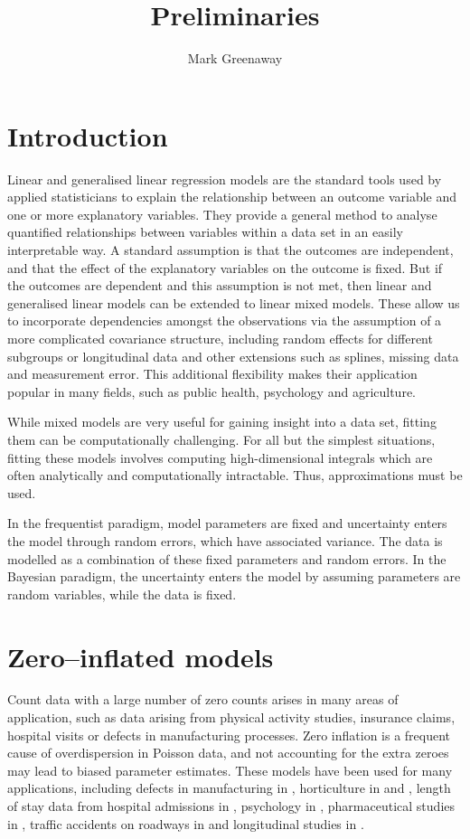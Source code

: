 \documentclass{amsart}[12pt]
\title{Preliminaries}
\author{Mark Greenaway}
\begin{document}
\setlength{\parindent}{0pt}
\maketitle

\section{Introduction}

Linear and generalised linear regression models are the standard tools used by applied statisticians to
explain the relationship between an outcome variable and one or more explanatory variables. They provide a
general method  to analyse quantified relationships between variables within a data set in an easily
interpretable way. A standard assumption is that the outcomes are independent, and that the effect of the
explanatory variables on the outcome is fixed. But if the outcomes are dependent and this assumption is not
met, then linear and generalised linear models can be extended to linear mixed models. These allow us to
incorporate dependencies amongst the  observations via the assumption of a more complicated covariance
structure, including random effects for  different subgroups or longitudinal data and other extensions such as
splines, missing data and measurement error. This additional flexibility makes their application popular in
many fields, such as public health, psychology and agriculture.

While mixed models are very useful for gaining insight into a data set, fitting them can be computationally
challenging. For all but the simplest situations, fitting these models involves computing high-dimensional
integrals which are often analytically and computationally intractable. Thus, approximations must be used.

In the frequentist paradigm, model parameters are fixed and uncertainty enters the model through random
errors, which have associated variance. The data is modelled as a combination of these fixed parameters and
random errors. In the Bayesian paradigm, the uncertainty enters the model by assuming parameters are random
variables, while the data is fixed.

\section{Zero--inflated models}
Count data with a large number of zero counts arises in many areas of application, such as data arising from
physical activity studies, insurance claims, hospital visits or defects in manufacturing processes. Zero
inflation is a frequent cause of overdispersion in Poisson data, and not accounting for the extra zeroes
may lead to biased parameter estimates. These models have been used for many applications, including defects
in manufacturing in \citep{lambert1992}, horticulture in \citep{BIOM:BIOM1030} and \citep{Hall2000}, length of
stay data from hospital admissions in \citep{BIMJ:BIMJ200390024}, psychology in \citep{JOFP:rethink},
pharmaceutical studies in \citep{Min01042005}, traffic accidents on roadways in \citep{Shankar1997829} and
longitudinal studies in \citep{LeeWangScottYauMcLachlan2006}.
\end{document}
